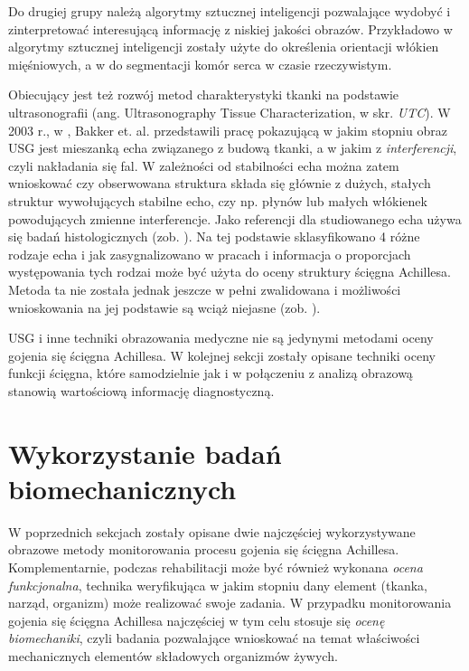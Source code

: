 Do drugiej grupy należą algorytmy sztucznej inteligencji pozwalające wydobyć i zinterpretować interesującą informację z niskiej jakości obrazów. Przykładowo w \cite{Cunningham2017} algorytmy sztucznej inteligencji zostały użyte do określenia orientacji włókien mięśniowych, a w \cite{NVIDIA-CLARA} do segmentacji komór serca w czasie rzeczywistym. 

Obiecujący jest też rozwój metod charakterystyki tkanki na podstawie ultrasonografii (ang. Ultrasonography Tissue Characterization, w skr. \textit{UTC}). W 2003 r., w \cite{Bakker2003}, Bakker et. al. przedstawili pracę pokazującą w jakim stopniu obraz USG jest mieszanką echa związanego z budową tkanki, a w jakim z \textit{interferencji}, czyli nakładania się fal. W zależności od stabilności echa można zatem wnioskować czy obserwowana struktura składa się głównie z dużych, stałych struktur wywołujących stabilne echo, czy np. płynów lub małych włókienek powodujących zmienne interferencje. Jako referencji dla studiowanego echa używa się badań histologicznych (zob. \cite{Bakker2000}). Na tej podstawie sklasyfikowano 4 różne rodzaje echa i jak zasygnalizowano w pracach \cite{vanSchie2009} i \cite{Heyward2018} informacja o proporcjach występowania tych rodzai może być użyta do oceny struktury ścięgna Achillesa. Metoda ta nie została jednak jeszcze w pełni zwalidowana i możliwości wnioskowania na jej podstawie są wciąż niejasne (zob. \cite{Heyward2018}).

USG i inne techniki obrazowania medyczne nie są jedynymi metodami oceny gojenia się ścięgna Achillesa. W kolejnej sekcji zostały opisane techniki oceny funkcji ścięgna, które samodzielnie jak i w połączeniu z analizą obrazową stanowią wartościową informację diagnostyczną.

\section{Wykorzystanie badań biomechanicznych}
\label{biomechanika}
W poprzednich sekcjach zostały opisane dwie najczęściej wykorzystywane obrazowe metody monitorowania procesu gojenia się ścięgna Achillesa. Komplementarnie, podczas rehabilitacji może być również wykonana \textit{ocena funkcjonalna}, technika weryfikująca w jakim stopniu dany element (tkanka, narząd, organizm) może realizować swoje zadania. W przypadku monitorowania gojenia się ścięgna Achillesa najczęściej w tym celu stosuje się \textit{ocenę biomechaniki}, czyli badania pozwalające wnioskować na temat właściwości mechanicznych elementów składowych organizmów żywych. 

